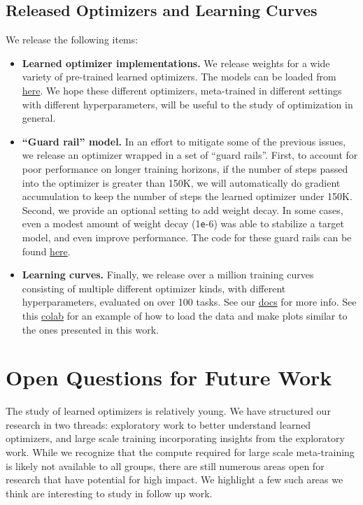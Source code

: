 \documentclass[11pt]{article}
\newcommand{\e}{\texttt{e}}
\begin{document}
\subsection{Released Optimizers and Learning Curves}
We release the following items:
\begin{itemize}
    \item \textbf{Learned optimizer implementations.} We release weights for a wide variety of pre-trained learned optimizers. The models can be loaded from \href{https://github.com/google/learned_optimization/blob/b1d8267c5e513a4112e7422b98bacc16e1f0e844/learned_optimization/research/general_lopt/pretrained_optimizers.py}{here}. We hope these different optimizers, meta-trained in different settings with different hyperparameters, will be useful to the study of optimization in general.
    \item \textbf{``Guard rail'' model.} In an effort to mitigate some of the previous issues, we release an optimizer wrapped in a set of ``guard rails''. First, to account for poor performance on longer training horizons, if the number of steps passed into the optimizer is greater than 150K, we will automatically do gradient accumulation to keep the number of steps the learned optimizer under 150K. Second, we provide an optional setting to add weight decay. In some cases, even a modest amount of weight decay (1\e-6) was able to stabilize a target model, and even improve performance. The code for these guard rails can be found \href{https://github.com/google/learned_optimization/blob/b1d8267c5e513a4112e7422b98bacc16e1f0e844/learned_optimization/research/general_lopt/prefab.py#L32}{here}.
    \item \textbf{Learning curves.} Finally, we release over a million training curves consisting of multiple different optimizer kinds, with different hyperparameters, evaluated on over 100 tasks. See our \href{https://learned-optimization.readthedocs.io/en/latest/optimizer_baselines.html}{docs} for more info. See this \href{https://colab.research.google.com/drive/1L2CuFrSvofW1L4BptHPjnfNGsBkFZ5-k#scrollTo=Iu5uuGqlGIQk}{colab} for an example of how to load the data and make plots similar to the ones presented in this work.
\end{itemize}



\section{Open Questions for Future Work} \label{app:open_questions}
The study of learned optimizers is relatively young. We have structured our research in two threads: exploratory work to better understand learned optimizers, and large scale training incorporating insights from the exploratory work.
While we recognize that the compute required for large scale meta-training is likely not available to all groups, there are still numerous areas open for research that have potential for high impact. 
We highlight a few such areas we think are interesting to study in follow up work.
\end{document}
